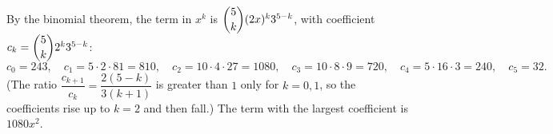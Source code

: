 By the binomial theorem, the term in $x^k$ is $\dbinom5k(2x)^k3^{5-k}$, with coefficient $c_k=\dbinom5k2^k3^{5-k}$:
\[c_0=243,\quad c_1=5\cdot2\cdot81=810,\quad c_2=10\cdot4\cdot27=1080,\quad c_3=10\cdot8\cdot9=720,\quad c_4=5\cdot16\cdot3=240,\quad c_5=32 .\]
(The ratio $\dfrac{c_{k+1}}{c_k}=\dfrac{2(5-k)}{3(k+1)}$ is greater than $1$ only for $k=0,1$, so the coefficients rise up to $k=2$ and then fall.) The term with the largest coefficient is $\boxed{1080x^2}$.
